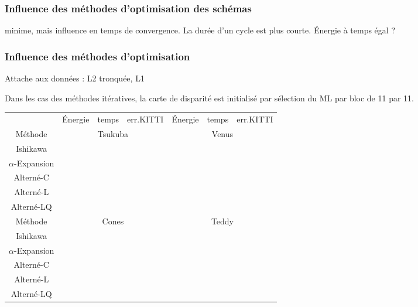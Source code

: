 \documentclass[../main/These_Mathias_Paget.tex]{subfiles}
\begin{document}
\subsubsection{Influence des méthodes d'optimisation des schémas}

minime, mais influence en temps de convergence.
La durée d'un cycle est plus courte.
Énergie à temps égal ?

\subsubsection{Influence des méthodes d'optimisation}

Attache aux données : L2 tronquée, L1

Dans les cas des méthodes itératives, la carte de disparité est initialisé par sélection du ML par bloc de 11 par 11. 

\begin{table}
\centering
\begin{tabular}{c|ccc|ccc}
 & Énergie & temps & err.KITTI   & Énergie & temps & err.KITTI \\
Méthode &  \multicolumn{3}{c|}{Tsukuba}   & \multicolumn{3}{c}{Venus} \\
\hline
Ishikawa &  \\
$\alpha$-Expansion &  \\
Alterné-C &  \\
Alterné-L &  \\
Alterné-LQ &  \\
Méthode &  \multicolumn{3}{c|}{Cones}   & \multicolumn{3}{c}{Teddy} \\
\hline
Ishikawa &  \\
$\alpha$-Expansion &  \\
Alterné-C &  \\
Alterné-L &  \\
Alterné-LQ &  \\
\end{tabular}
\end{table}
\end{document}

